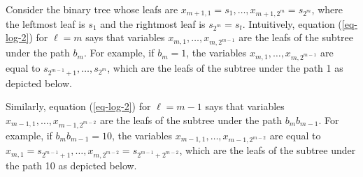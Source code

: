 Consider the binary tree whose leafs are $x_{m+1,1}=s_1,\ldots,x_{m+1,2^m}=s_{2^m}$, where the leftmost leaf is $s_1$ and the rightmost leaf is $s_{2^m}=s_t$. Intuitively, equation (\ref{eq-log-2}) for $\ell=m$ says that variables $x_{m,1},\ldots, x_{m,2^{m-1}}$ are the leafs of the subtree under the path $b_m$. For example, if $b_m=1$, the variables $x_{m,1},\ldots,x_{m,2^{m-1}}$ are equal to $s_{2^{m-1}+1},\ldots,s_{2^m}$, which are the leafs of the subtree under the path 1 as depicted below.
\begin{center}
\end{center}
Similarly, equation (\ref{eq-log-2}) for $\ell=m-1$ says that variables $x_{m-1,1},\ldots,x_{m-1,2^{m-2}}$ are the leafs of the subtree under the path $b_mb_{m-1}$. For example, if $b_mb_{m-1}=10$, the variables $x_{m-1,1},\ldots,x_{m-1,2^{m-2}}$ are equal to $x_{m,1}=s_{2^{m-1}+1},\ldots,\allowbreak x_{m,2^{m-2}}=s_{2^{m-1}+2^{m-2}}$, which are the leafs of the subtree under the path 10 as depicted below.
\begin{center}
\begin{tiny}\end{tiny}
\end{center}

